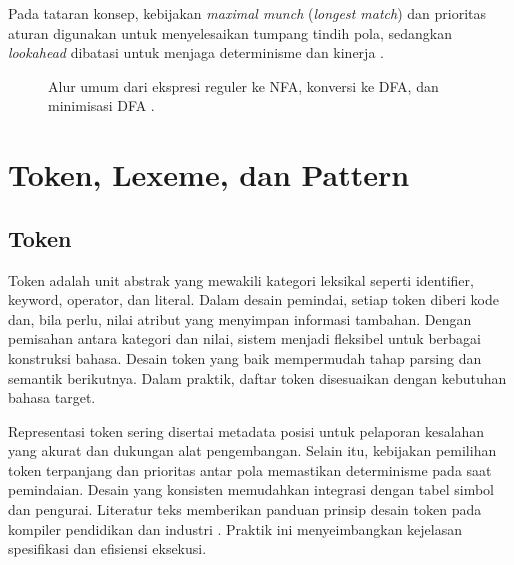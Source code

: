 \documentclass[../main.tex]{subfiles}
\begin{document}
Pada tataran konsep, kebijakan \emph{maximal munch} (\emph{longest match}) dan prioritas aturan digunakan untuk menyelesaikan tumpang tindih pola, sedangkan \emph{lookahead} dibatasi untuk menjaga determinisme dan kinerja \citep{WikiMaximalMunch,WikiLexicalAnalysis}.

\begin{figure}[t]
  \centering
  \caption{Alur umum dari ekspresi reguler ke NFA, konversi ke DFA, dan minimisasi DFA \citep{WikiRegex,WikiNFA,WikiDFA,WikiDFAMin}.}
  \label{fig:re-nfa-dfa}
\end{figure}

\section{Token, Lexeme, dan Pattern}
\subsection{Token}
Token adalah unit abstrak yang mewakili kategori leksikal seperti identifier, keyword, operator, dan literal. Dalam desain pemindai, setiap token diberi kode dan, bila perlu, nilai atribut yang menyimpan informasi tambahan. Dengan pemisahan antara kategori dan nilai, sistem menjadi fleksibel untuk berbagai konstruksi bahasa. Desain token yang baik mempermudah tahap parsing dan semantik berikutnya. Dalam praktik, daftar token disesuaikan dengan kebutuhan bahasa target.

Representasi token sering disertai metadata posisi untuk pelaporan kesalahan yang akurat dan dukungan alat pengembangan. Selain itu, kebijakan pemilihan token terpanjang dan prioritas antar pola memastikan determinisme pada saat pemindaian. Desain yang konsisten memudahkan integrasi dengan tabel simbol dan pengurai. Literatur teks memberikan panduan prinsip desain token pada kompiler pendidikan dan industri \citep{Mogensen2010,CS143}. Praktik ini menyeimbangkan kejelasan spesifikasi dan efisiensi eksekusi.
\end{document}
